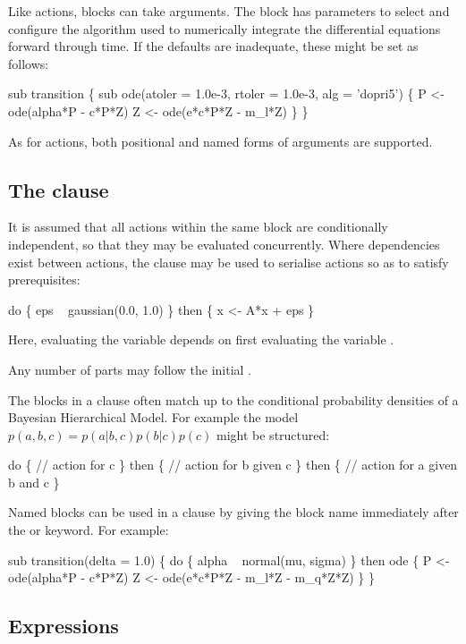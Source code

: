 Like actions, blocks can take arguments. The  block has
parameters to select and configure the algorithm used to numerically integrate
the differential equations forward through time. If the defaults are
inadequate, these might be set as follows:
\begin{bicode}
sub transition \{
  sub ode(atoler = 1.0e-3, rtoler = 1.0e-3, alg = 'dopri5') \{
    P <- ode(alpha*P - c*P*Z)
    Z <- ode(e*c*P*Z - m_l*Z)
  \}
\}
\end{bicode}
As for actions, both positional and named forms of arguments are supported.

\subsection{The  clause\label{do_then}}

It is assumed that all actions within the same block are conditionally
independent, so that they may be evaluated concurrently. Where dependencies
exist between actions, the  clause may be used to serialise
actions so as to satisfy prerequisites:
\begin{bicode}
do \{
  eps ~ gaussian(0.0, 1.0)
\} then \{
  x <- A*x + eps
\}
\end{bicode}
Here, evaluating the variable  depends on first evaluating the
variable .

Any number of  parts may follow the initial .

\begin{tip}
The blocks in a  clause often match up to
the conditional probability densities of a Bayesian Hierarchical Model. For
example the model $p(a,b,c) = p(a|b,c)p(b|c)p(c)$ might be structured:
\begin{bicode}
do \{
  // action for c
\} then \{
  // action for b given c
\} then \{
  // action for a given b and c
\}
\end{bicode}
\end{tip}

Named blocks can be used in a  clause by giving the block name
immediately after the  or  keyword. For example:
\begin{bicode}
sub transition(delta = 1.0) \{
  do \{
    alpha ~ normal(mu, sigma)
  \} then ode \{
    P <- ode(alpha*P - c*P*Z)
    Z <- ode(e*c*P*Z - m_l*Z - m_q*Z*Z)
  \}
\}
\end{bicode}

\subsection{Expressions\label{Expressions}}

